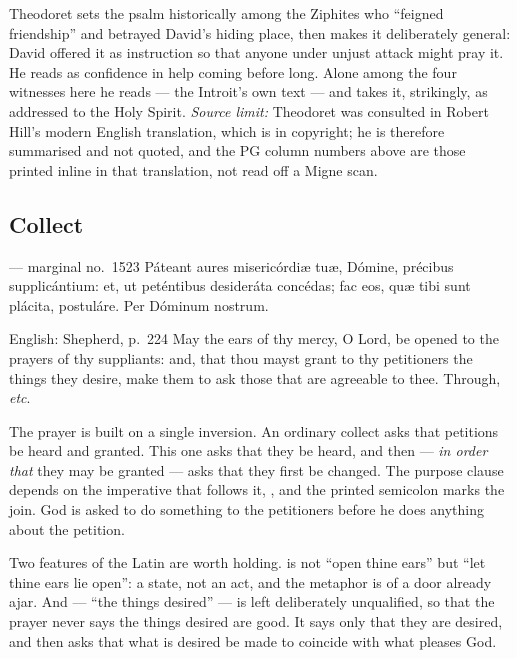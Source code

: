 \begin{witnessnote}
Theodoret sets the psalm historically among the Ziphites who ``feigned
friendship'' and betrayed David's hiding place, then makes it deliberately
general: David offered it as instruction so that anyone under unjust attack
might pray it. He reads  as confidence in help
coming before long. Alone among the four witnesses here he reads  --- the Introit's own text --- and takes it, strikingly, as
addressed to the Holy Spirit. \textit{Source limit:} Theodoret was consulted
in Robert Hill's modern English translation, which is in copyright; he is
therefore summarised and not quoted, and the PG column numbers above are those
printed inline in that translation, not read off a Migne scan.
\end{witnessnote}

\subsection*{Collect }

\begin{appointedlatin}{ --- marginal no.\ 1523}
Páteant aures misericórdiæ tuæ, Dómine, précibus supplicántium: et, ut
peténtibus desideráta concédas; fac eos, quæ tibi sunt plácita, postuláre. Per
Dóminum nostrum.
\end{appointedlatin}

\begin{namedtranslation}{English: Shepherd, p.~224}
May the ears of thy mercy, O Lord, be opened to the prayers of thy suppliants:
and, that thou mayst grant to thy petitioners the things they desire, make
them to ask those that are agreeable to thee. Through, \textit{etc}.
\end{namedtranslation}

The prayer is built on a single inversion. An ordinary collect asks that
petitions be heard and granted. This one asks that they be heard, and then ---
\textit{in order that} they may be granted --- asks that they first be
changed. The purpose clause  depends
on the imperative that follows it, , and the
printed semicolon marks the join. God is asked to do something to the
petitioners before he does anything about the petition.

Two features of the Latin are worth holding.  is not ``open
thine ears'' but ``let thine ears lie open'': a state, not an act, and the
metaphor is of a door already ajar. And  --- ``the things
desired'' --- is left deliberately unqualified, so that the prayer never says
the things desired are good. It says only that they are desired, and then
asks that what is desired be made to coincide with what pleases God.

